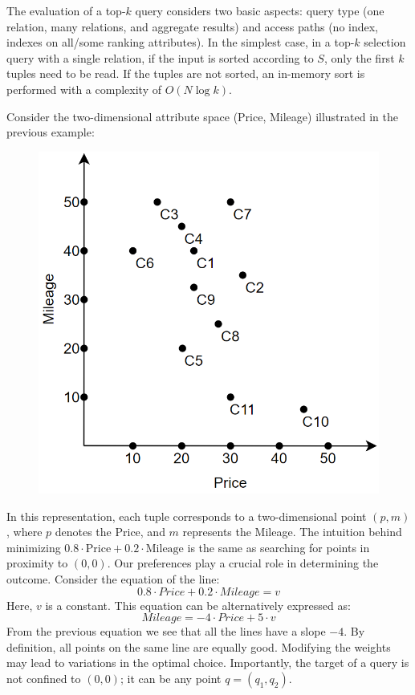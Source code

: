 The evaluation of a top-$k$ query considers two basic aspects: query type (one relation, many relations, and aggregate results) and access paths (no index, indexes on all/some ranking attributes).
In the simplest case, in a top-$k$ selection query with a single relation, if the input is sorted according to $S$, only the first $k$ tuples need to be read.
If the tuples are not sorted, an in-memory sort is performed with a complexity of $O(N\log{k})$.
\begin{example}
    Consider the two-dimensional attribute space (Price, Mileage) illustrated in the previous example:
    \begin{figure}[H]
        \centering
        \includegraphics[width=0.25\linewidth]{images/ex1.png}
    \end{figure}
    In this representation, each tuple corresponds to a two-dimensional point $(p, m)$, where $p$ denotes the Price, and $m$ represents the Mileage. 
    The intuition behind minimizing $0.8 \cdot \text{Price} + 0.2 \cdot \text{Mileage}$ is the same as searching for points in proximity to $(0,0)$.
    Our preferences play a crucial role in determining the outcome. 
    Consider the equation of the line:
    \[0.8\cdot Price + 0.2\cdot Mileage = v\]
    Here, $v$ is a constant. 
    This equation can be alternatively expressed as:
    \[Mileage = -4\cdot Price + 5\cdot v\]
    From the previous equation we see that all the lines have a slope $-4$. 
    By definition, all points on the same line are equally good. 
    Modifying the weights may lead to variations in the optimal choice. 
    Importantly, the target of a query is not confined to $(0,0)$; it can be any point $q=(q_1,q_2)$.
\end{example}

